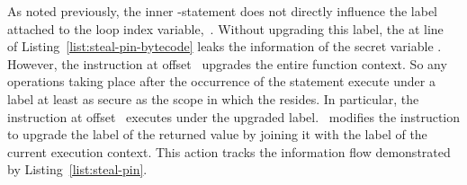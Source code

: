 As noted previously, the inner -statement does not directly influence the label attached to the loop index variable,~.
Without upgrading this label, the  at line~ of Listing~\ref{list:steal-pin-bytecode} leaks the information of the secret variable .
However, the \popj instruction at offset~ upgrades the entire function context.
So any operations taking place after the occurrence of the  statement execute under a label at least as secure as the scope in which the  resides.
In particular, the  instruction at offset~ executes under the upgraded label.
\FlowCore\ modifies the  instruction to upgrade the label of the returned value by joining it with the label of the current execution context.
This action tracks the information flow demonstrated by Listing~\ref{list:steal-pin}.



